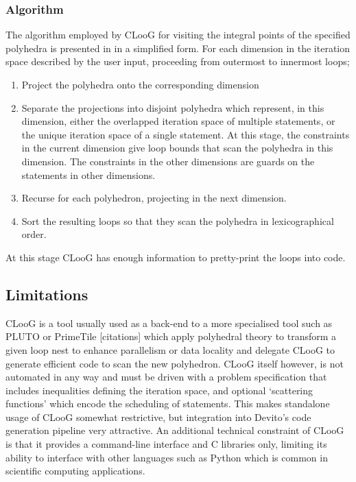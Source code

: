 \documentclass[a4paper,12pt,twoside]{report}
\begin{document}
\subsubsection*{Algorithm}
The algorithm employed by CLooG for visiting the integral points of the specified polyhedra is presented in in a simplified form.
For each dimension in the iteration space described by the user input, proceeding from outermost to innermost loops;
\begin{enumerate}
    \item Project the polyhedra onto the corresponding dimension 
    \item Separate the projections into disjoint polyhedra which represent, in this dimension, either the overlapped iteration
        space of multiple statements, or the unique iteration space of a single statement. At this stage, the constraints in the current
        dimension give loop bounds that scan the polyhedra in this dimension. The constraints in the other dimensions are guards on 
        the statements in other dimensions.
    \item Recurse for each polyhedron, projecting in the next dimension.
    \item Sort the resulting loops so that they scan the polyhedra in lexicographical order.
\end{enumerate}
At this stage CLooG has enough information to pretty-print the loops into code.

\subsection*{Limitations}
CLooG is a tool usually used as a back-end to a more specialised tool such as PLUTO or PrimeTile [citations] which
apply polyhedral theory to transform a given loop nest to enhance parallelism or data locality and delegate CLooG to generate
efficient code to scan the new polyhedron. CLooG itself however, is not automated in any way and must be driven with a problem
specification that includes inequalities defining the iteration space, and optional `scattering functions' which encode the scheduling
of statements. This makes standalone usage of CLooG somewhat restrictive, but integration into Devito's code generation pipeline
very attractive. An additional technical constraint of CLooG is that it provides a command-line interface and C libraries only,
limiting its ability to interface with other languages such as Python which is common in scientific computing applications.
\end{document}
